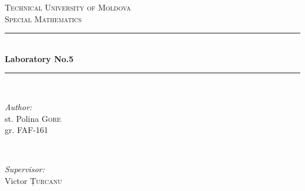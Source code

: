 \documentclass{article}
\begin{document}
  \begin{titlepage}

    \newcommand{\HRule}{\rule{\linewidth}{0.5mm}} %

    \center %


    \textsc{\LARGE Technical University of Moldova}\\[1.5cm]
    \textsc{\Large Special Mathematics}\\[0.5cm] %


    \HRule \\[0.4cm]
    { \huge \bfseries Laboratory No.5}\\[0.4cm] %
    \HRule \\[1.5cm]


    \begin{minipage}{0.4\textwidth}
      \begin{flushleft} \large
        \emph{Author:}\\
          st. Polina \textsc{Gore}\\ gr. FAF-161 %
      \end{flushleft}
    \end{minipage}
~
    \begin{minipage}{0.4\textwidth}
      \begin{flushright} \large
        \emph{Supervisor:} \\
        Victor \textsc{Țurcanu} %
      \end{flushright}
    \end{minipage}\\[2cm]



\end{titlepage}
\end{document}
